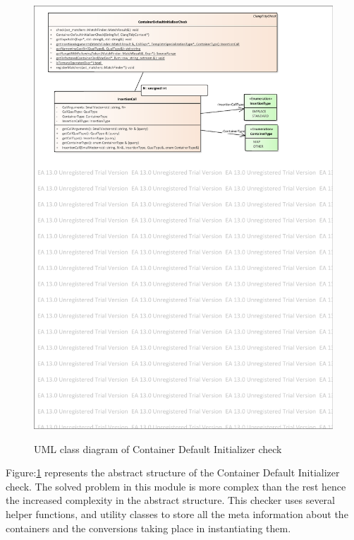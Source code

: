 \begin{figure}[H]
	\caption{UML class diagram of Container Default Initializer check}
	\centering
	\includegraphics[scale=0.85]{images/ContainerDefaultInitializer.pdf}
	\label{container_init_class}
\end{figure}
\par Figure:\ref{container_init_class} represents the abstract structure of the Container Default Initializer check. The solved problem in this module is more complex than the rest hence the increased complexity in the abstract structure. This checker uses several helper functions, and utility classes to store all the meta information about the containers and the conversions taking place in instantiating them.
